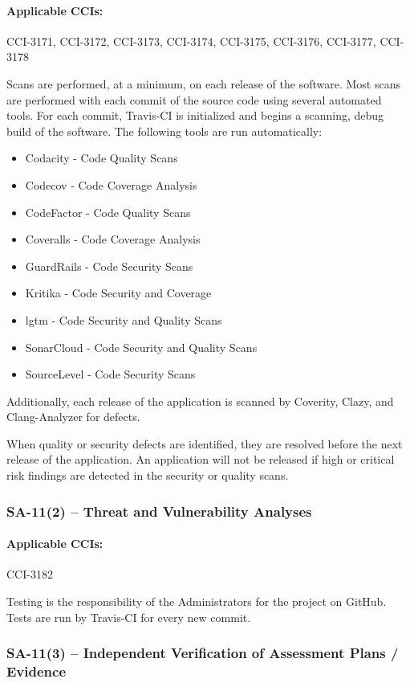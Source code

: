 \documentclass[letterpaper, 10pt, twoside]{article}
\begin{document}
\paragraph{Applicable CCIs:} CCI-3171, CCI-3172, CCI-3173, CCI-3174, CCI-3175, CCI-3176, CCI-3177, CCI-3178

Scans are performed, at a minimum, on each release of the software. Most scans are performed with each commit of the source code using several automated tools. For each commit, Travis-CI is initialized and begins a scanning, debug build of the software. The following tools are run automatically:
\begin{itemize}
	\item Codacity - Code Quality Scans
	\item Codecov - Code Coverage Analysis
	\item CodeFactor - Code Quality Scans
	\item Coveralls - Code Coverage Analysis
	\item GuardRails - Code Security Scans
	\item Kritika - Code Security and Coverage
	\item lgtm - Code Security and Quality Scans
	\item SonarCloud - Code Security and Quality Scans
	\item SourceLevel - Code Security Scans
\end{itemize}

Additionally, each release of the application is scanned by Coverity, Clazy, and Clang-Analyzer for defects.

When quality or security defects are identified, they are resolved before the next release of the application. An application will not be released if high or critical risk findings are detected in the security or quality scans.

\subsubsection{SA-11(2) -- Threat and Vulnerability Analyses}

\paragraph{Applicable CCIs:} CCI-3182

Testing is the responsibility of the Administrators for the project on GitHub. Tests are run by Travis-CI for every new commit.

\subsubsection{SA-11(3) -- Independent Verification of Assessment Plans / Evidence}
\end{document}

